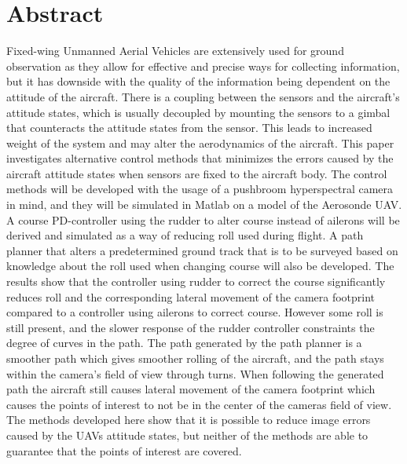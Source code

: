 \section*{Abstract}

Fixed-wing Unmanned Aerial Vehicles are extensively used for ground observation as they allow for effective and precise ways for collecting information, but it has downside with the quality of the information being dependent on the attitude of the aircraft. There is a coupling between the sensors and the aircraft's attitude states, which is usually decoupled by mounting the sensors to a gimbal that counteracts the attitude states from the sensor. This leads to increased weight of the system and may alter the aerodynamics of the aircraft. This paper investigates alternative control methods that minimizes the errors caused by the aircraft attitude states when sensors are fixed to the aircraft body. The control methods will be developed with the usage of a pushbroom hyperspectral camera in mind, and they will be simulated in Matlab on a model of the Aerosonde UAV. A course PD-controller using the rudder to alter course instead of ailerons will be derived and simulated as a way of reducing roll used during flight. A path planner that alters a predetermined ground track that is to be surveyed based on knowledge about the roll used when changing course will also be developed. The results show that the controller using rudder to correct the course significantly reduces roll and the corresponding lateral movement of the camera footprint compared to a controller using ailerons to correct course. However some roll is still present, and the slower response of the rudder controller constraints the degree of curves in the path. The path generated by the path planner is a smoother path which gives smoother rolling of the aircraft, and the path stays within the camera's field of view through turns. When following the generated path the aircraft still causes lateral movement of the camera footprint which causes the points of interest to not be in the center of the cameras field of view. The methods developed here show that it is possible to reduce image errors caused by the UAVs attitude states, but neither of the methods are able to guarantee that the points of interest are covered.